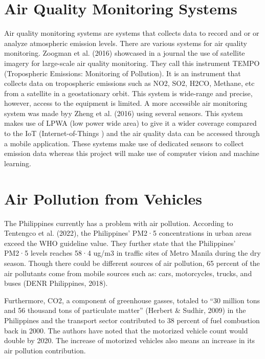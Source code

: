\section{Air Quality Monitoring Systems}
Air quality monitoring systems are systems that collects data to record and or or analyze atmospheric emission levels. There are various systems for air quality monitoring. Zoogman et al. (2016) showcased in a journal the use of satellite imagery for large-scale air quality monitoring. They call this instrument TEMPO (Tropospheric Emissions: Monitoring of Pollution). It is an instrument that collects data on tropospheric emissions such as NO2, SO2, H2CO, Methane, etc from a satellite in a geostationary orbit. This system is wide-range and precise,  however, access to the equipment is limited.  A more accessible air monitoring system was made byy Zheng et al. (2016) using several sensors. This system makes use of LPWA (low power wide area) to give it a wider coverage compared to the IoT (Internet-of-Things ) and the air quality data can be accessed through a mobile application. These systems make use of dedicated sensors to collect emission data whereas this project will make use of computer vision and machine learning.


\section{Air Pollution from Vehicles}
The Philippines currently has a problem with air pollution. According to Tentengco et al. (2022), the Philippines’ PM2·5 concentrations in urban areas exceed the WHO guideline value. They further state that the Philippines’ PM2·5 levels reaches 58·4 ug/m3 in traffic sites of Metro Manila during the dry season. Though there could be different sources of air pollution, 65 percent of the air pollutants come from mobile sources such as: cars, motorcycles, trucks, and buses (DENR Philippines, 2018).

	Furthermore, CO2, a component of greenhouse gasses, totaled  to “30 million tons and 56 thousand tons of particulate matter” (Herbert \& Sudhir, 2009) in the Philippines and the transport sector contributed to 38 percent of fuel combustion back in 2000. The authors have noted that the motorized vehicle count would double by 2020. The increase of motorized vehicles also means an increase in its air pollution contribution. 


